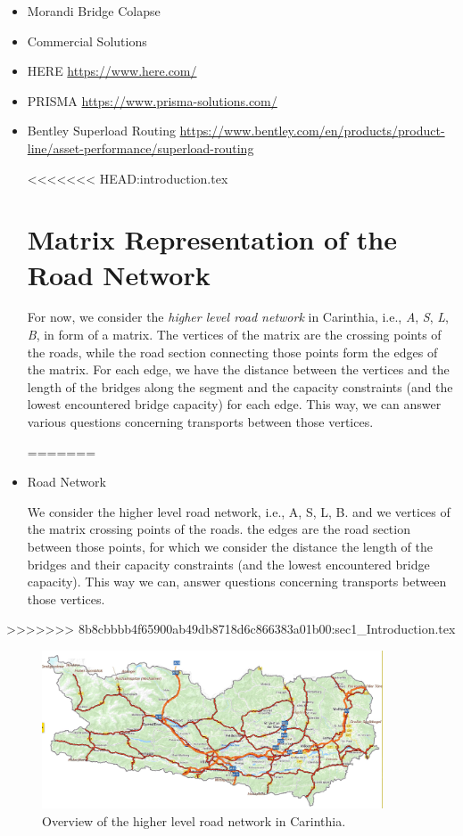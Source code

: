 \begin{itemize}
\item Morandi Bridge Colapse

\cite{Morgese.2020}
\cite{MorandiNYTimes}


\item Commercial Solutions

\item HERE
\url{https://www.here.com/}
\item PRISMA
\url{https://www.prisma-solutions.com/}

\item Bentley Superload Routing
\url{https://www.bentley.com/en/products/product-line/asset-performance/superload-routing}



<<<<<<< HEAD:introduction.tex
\section{Matrix Representation of the Road Network}

For now, we consider the \textit{higher level road network} in Carinthia,
i.e., \textit{A}, \textit{S}, \textit{L}, \textit{B}, in form of a matrix.
The vertices of the matrix are the crossing points of the roads, while
the road section connecting those points form the edges of the matrix.
For each edge, we have the distance between the vertices and the length of the bridges along the segment and the capacity constraints (and the lowest encountered bridge capacity) for each edge.
This way, we can answer various questions concerning transports between those vertices.


=======
\item Road Network

We consider the higher level road network, i.e., A, S, L, B.
and we vertices of the matrix crossing points of the roads.
the edges are the road section between those points, for which we
consider the distance the length of the bridges and their capacity constraints (and the lowest encountered bridge capacity).
This way we can, answer questions concerning transports between those vertices.
\end{itemize}
>>>>>>> 8b8cbbbb4f65900ab49db8718d6c866383a01b00:sec1_Introduction.tex

\begin{figure}
 \centering
  \includegraphics[width=0.9\textwidth]{map.jpg}
  \caption{Overview of the higher level road network in Carinthia.}
  \label{fig:higher level}
\end{figure}
